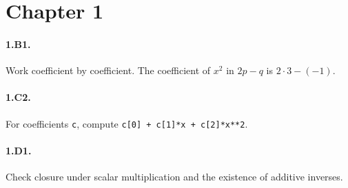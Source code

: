 \section*{Chapter 1}

\paragraph{1.B1.}
Work coefficient by coefficient. The coefficient of $x^2$ in $2p-q$ is
$2\cdot 3-(-1)$.

\paragraph{1.C2.}
For coefficients \texttt{c}, compute \texttt{c[0] + c[1]*x + c[2]*x**2}.

\paragraph{1.D1.}
Check closure under scalar multiplication and the existence of additive
inverses.
